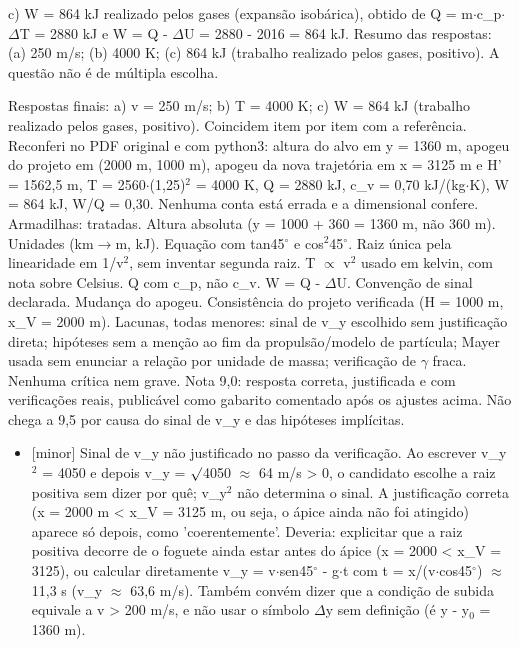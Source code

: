 \documentclass{article}%
\begin{document}
c) W = 864 kJ realizado pelos gases (expansão isobárica), obtido de Q = m$\cdot$c\_p$\cdot$$\Delta$T = 2880 kJ e W = Q - $\Delta$U = 2880 - 2016 = 864 kJ.\newline%
\newline%
Resumo das respostas: (a) 250 m/s; (b) 4000 K; (c) 864 kJ (trabalho realizado pelos gases, positivo). A questão não é de múltipla escolha.\par %
Respostas finais: a) v = 250 m/s; b) T = 4000 K; c) W = 864 kJ (trabalho realizado pelos gases, positivo). Coincidem item por item com a referência. Reconferi no PDF original e com python3: altura do alvo em y = 1360 m, apogeu do projeto em (2000 m, 1000 m), apogeu da nova trajetória em x = 3125 m e H' = 1562,5 m, T = 2560$\cdot$(1,25)$^2$ = 4000 K, Q = 2880 kJ, c\_v = 0,70 kJ/(kg$\cdot$K), W = 864 kJ, W/Q = 0,30. Nenhuma conta está errada e a dimensional confere.\newline%
\newline%
Armadilhas: tratadas. Altura absoluta (y = 1000 + 360 = 1360 m, não 360 m). Unidades (km$\to$m, kJ). Equação com tan45$^\circ$ e cos$^2$45$^\circ$. Raiz única pela linearidade em 1/v$^2$, sem inventar segunda raiz. T $\propto$ v$^2$ usado em kelvin, com nota sobre Celsius. Q com c\_p, não c\_v. W = Q - $\Delta$U. Convenção de sinal declarada. Mudança do apogeu. Consistência do projeto verificada (H = 1000 m, x\_V = 2000 m).\newline%
\newline%
Lacunas, todas menores: sinal de v\_y escolhido sem justificação direta; hipóteses sem a menção ao fim da propulsão/modelo de partícula; Mayer usada sem enunciar a relação por unidade de massa; verificação de $\gamma$ fraca. Nenhuma crítica nem grave.\newline%
\newline%
Nota 9,0: resposta correta, justificada e com verificações reais, publicável como gabarito comentado após os ajustes acima. Não chega a 9,5 por causa do sinal de v\_y e das hipóteses implícitas.%
\begin{itemize}%
\item%
{[}minor{]} Sinal de v\_y não justificado no passo da verificação. Ao escrever v\_y$^2$ = 4050 e depois v\_y = $\surd$4050 $\approx$ 64 m/s > 0, o candidato escolhe a raiz positiva sem dizer por quê; v\_y$^2$ não determina o sinal. A justificação correta (x = 2000 m < x\_V = 3125 m, ou seja, o ápice ainda não foi atingido) aparece só depois, como 'coerentemente'. Deveria: explicitar que a raiz positiva decorre de o foguete ainda estar antes do ápice (x = 2000 < x\_V = 3125), ou calcular diretamente v\_y = v$\cdot$sen45$^\circ$ - g$\cdot$t com t = x/(v$\cdot$cos45$^\circ$) $\approx$ 11,3 s (v\_y $\approx$ 63,6 m/s). Também convém dizer que a condição de subida equivale a v > 200 m/s, e não usar o símbolo $\Delta$y sem definição (é y - y$_{0}$ = 1360 m).%

\end{itemize}$$
\end{document}
